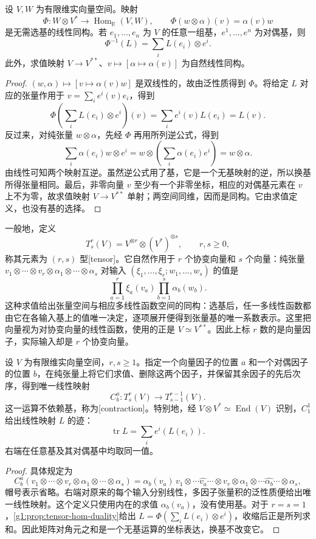 \begin{proposition}
	\label{g1:prop:tensor-hom-duality}
	设 \(V,W\) 为有限维实向量空间。映射
	\[
		\Phi:W\otimes V^*\longrightarrow\operatorname{Hom}_{\mathbb R}(V,W),\qquad
		\Phi(w\otimes\alpha)(v)=\alpha(v)w
	\]
	是无需选基的线性同构。若 \(e_1,\ldots,e_n\) 为 \(V\) 的任意一组基，\(e^1,\ldots,e^n\) 为对偶基，则
	\[
		\Phi^{-1}(L)=\sum_i L(e_i)\otimes e^i.
	\]
	此外，求值映射 \(V\to V^{**}\)、\(v\mapsto[\alpha\mapsto\alpha(v)]\) 为自然线性同构。
\end{proposition}
\begin{proof}
	\((w,\alpha)\mapsto[v\mapsto\alpha(v)w]\) 是双线性的，故由泛性质得到 \(\Phi\)。将给定 \(L\) 对应的张量作用于 \(v=\sum_i e^i(v)e_i\)，得到
	\[
		\Phi\left(\sum_iL(e_i)\otimes e^i\right)(v)=\sum_i e^i(v)L(e_i)=L(v).
	\]
	反过来，对纯张量 \(w\otimes\alpha\)，先经 \(\Phi\) 再用所列逆公式，得到
	\[
		\sum_i\alpha(e_i)w\otimes e^i
		=w\otimes\left(\sum_i\alpha(e_i)e^i\right)=w\otimes\alpha.
	\]
	由线性可知两个映射互逆。虽然逆公式用了基，它是一个无基映射的逆，所以换基所得张量相同。最后，非零向量 \(v\) 至少有一个非零坐标，相应的对偶基元素在 \(v\) 上不为零，故求值映射 \(V\to V^{**}\) 单射；两空间同维，因而是同构。它由求值定义，也没有基的选择。
\end{proof}

一般地，定义
\[
	T^r_s(V)=V^{\otimes r}\otimes(V^*)^{\otimes s},\qquad r,s\ge0,
\]
称其元素为 \((r,s)\) 型[tensor]。它自然作用于 \(r\) 个协变向量和 \(s\) 个向量：纯张量 \(v_1\otimes\cdots\otimes v_r\otimes\alpha_1\otimes\cdots\otimes\alpha_s\) 对输入 \((\xi_1,\ldots,\xi_r;w_1,\ldots,w_s)\) 的值是
\[
	\prod_{a=1}^r\xi_a(v_a)\prod_{b=1}^s\alpha_b(w_b).
\]
这种求值给出张量空间与相应多线性函数空间的同构：选基后，任一多线性函数都由它在各输入基上的值唯一决定，逐项展开便得到张量基的唯一系数表示。这里把向量视为对协变向量的线性函数，使用的正是 \(V\simeq V^{**}\)。因此上标 \(r\) 数的是向量因子，实际输入却是 \(r\) 个协变向量。

\begin{proposition}
	\label{g1:prop:tensor-contraction}
	设 \(V\) 为有限维实向量空间，\(r,s\ge1\)。指定一个向量因子的位置 \(a\) 和一个对偶因子的位置 \(b\)，在纯张量上将它们求值、删除这两个因子，并保留其余因子的先后次序，得到唯一线性映射
	\[
		C^a_b:T^r_s(V)\longrightarrow T^{r-1}_{s-1}(V).
	\]
	这一运算不依赖基，称为[contraction]。特别地，经 \(V\otimes V^*\simeq\operatorname{End}(V)\) 识别，\(C^1_1\) 给出线性映射 \(L\) 的迹：
	\[
		\operatorname{tr}L=\sum_i e^i(L(e_i)).
	\]
	右端在任意基及其对偶基中均取同一值。
\end{proposition}
\begin{proof}
	具体规定为
	\[
		C^a_b(v_1\otimes\cdots\otimes v_r\otimes\alpha_1\otimes\cdots\otimes\alpha_s)
		=\alpha_b(v_a)\,v_1\otimes\cdots\widehat{v_a}\cdots\otimes v_r
		\otimes\alpha_1\otimes\cdots\widehat{\alpha_b}\cdots\otimes\alpha_s,
	\]
	帽号表示省略。右端对原来的每个输入分别线性，多因子张量积的泛性质便给出唯一线性映射。这个定义只使用内在的求值 \(\alpha_b(v_a)\)，没有使用基。对于 \(r=s=1\)，\cref{g1:prop:tensor-hom-duality}给出 \(L=\Phi(\sum_iL(e_i)\otimes e^i)\)，收缩后正是所列求和。因此矩阵对角元之和是一个无基运算的坐标表达，换基不改变它。
\end{proof}

